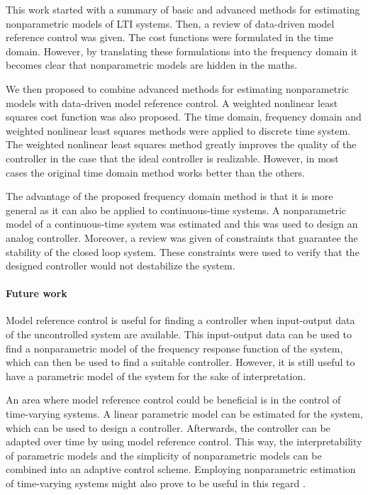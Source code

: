 This work started with a summary of basic and advanced methods for estimating nonparametric models of LTI systems. Then, a review of data-driven model reference control was given. The cost functions were formulated in the time domain. However, by translating these formulations into the frequency domain it becomes clear that nonparametric models are hidden in the maths.

We then proposed to combine advanced methods for estimating nonparametric models with data-driven model reference control. A weighted nonlinear least squares cost function was also proposed. The time domain, frequency domain and weighted nonlinear least squares methods were applied to discrete time system. The weighted nonlinear least squares method greatly improves the quality of the controller in the case that the ideal controller is realizable. However, in most cases the original time domain method works better than the others.

The advantage of the proposed frequency domain method is that it is more general as it can also be applied to continuous-time systems. A nonparametric model of a continuous-time system was estimated and this was used to design an analog controller. Moreover, a review was given of constraints that guarantee the stability of the closed loop system. These constraints were used to verify that the designed controller would not destabilize the system.

\paragraph{Future work}
Model reference control is useful for finding a controller when input-output data of the uncontrolled system are available. This input-output data can be used to find a nonparametric model of the frequency response function of the system, which can then be used to find a suitable controller. However, it is still useful to have a parametric model of the system for the sake of interpretation.

An area where model reference control could be beneficial is in the control of time-varying systems. A linear parametric model can be estimated for the system, which can be used to design a controller. Afterwards, the controller can be adapted over time by using model reference control. This way, the interpretability of parametric models and the simplicity of nonparametric models can be combined into an adaptive control scheme. Employing nonparametric estimation of time-varying systems might also prove to be useful in this regard \cite{Lataire_time-varying}.


